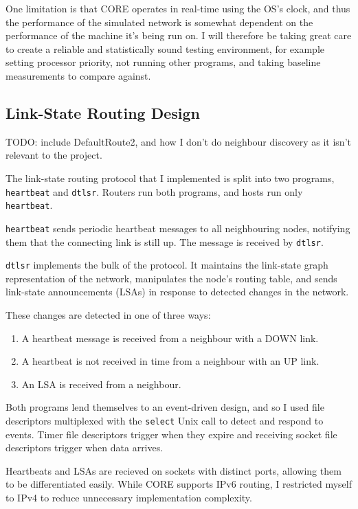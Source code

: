 \documentclass[10pt,twoside,a4paper]{article}
\begin{document}
One limitation is that CORE operates in real-time using the OS's clock, and thus the performance of the simulated network is somewhat dependent on the performance of the machine it's being run on. I will therefore be taking great care to create a reliable and statistically sound testing environment, for example setting processor priority, not running other programs, and taking baseline measurements to compare against.

\subsection{Link-State Routing Design}

TODO: include DefaultRoute2, and how I don't do neighbour discovery as it isn't relevant to the project.

The link-state routing protocol that I implemented is split into two programs, \texttt{heartbeat} and \texttt{dtlsr}. Routers run both programs, and hosts run only \texttt{heartbeat}.

\texttt{heartbeat} sends periodic heartbeat messages to all neighbouring nodes, notifying them that the connecting link is still up. The message is received by \texttt{dtlsr}.

\texttt{dtlsr} implements the bulk of the protocol. It maintains the link-state graph representation of the network, manipulates the node's routing table, and sends link-state announcements (LSAs) in response to detected changes in the network.

These changes are detected in one of three ways:
\begin{enumerate}
	\item
	A heartbeat message is received from a neighbour with a DOWN link.
	
	\item
	A heartbeat is not received in time from a neighbour with an UP link.
	
	\item
	An LSA is received from a neighbour.
\end{enumerate}

Both programs lend themselves to an event-driven design, and so I used file descriptors multiplexed with the \texttt{select} Unix call to detect and respond to events. Timer file descriptors trigger when they expire and receiving socket file descriptors trigger when data arrives.

Heartbeats and LSAs are recieved on sockets with distinct ports, allowing them to be differentiated easily. While CORE supports IPv6 routing, I restricted myself to IPv4 to reduce unnecessary implementation complexity.
\end{document}
